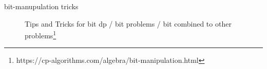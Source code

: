 {\begin{exercise}
\begin{description}
        \item[bit-manupulation tricks] Tips and Tricks for bit dp / bit problems / bit combined to other problems\footnote{https://cp-algorithms.com/algebra/bit-manipulation.html}
        

       
        
        
        
\end{description}
\end{exercise}}